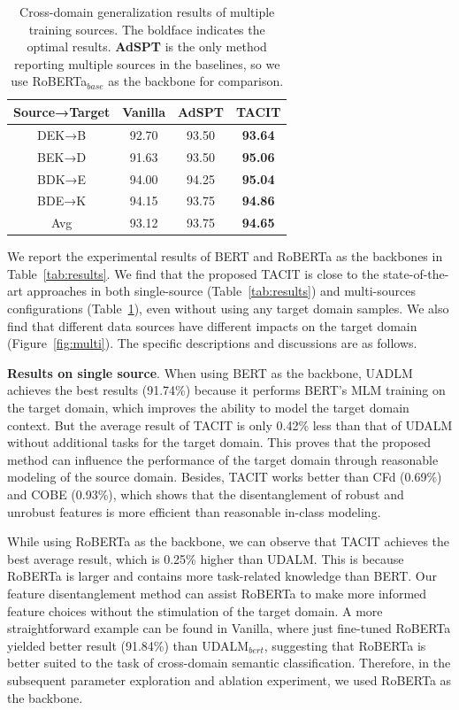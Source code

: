 \documentclass[letterpaper]{article} %
\begin{document}
\begin{table}[htbp]
	\centering
	\setlength\tabcolsep{3.3mm}
	\renewcommand{\arraystretch}{0.5}
	\begin{tabular}{cccc}
		\hline  \hline
		Source→Target & Vanilla & AdSPT & TACIT \\ \hline
		DEK→B & 92.70 & 93.50  & \textbf{93.64} \\
		BEK→D & 91.63 & 93.50  & \textbf{95.06} \\
		BDK→E & 94.00 & 94.25 & \textbf{95.04} \\
		BDE→K & 94.15 & 93.75 & \textbf{94.86} \\  \hline
		Avg   & 93.12 & 93.75 & \textbf{94.65} \\ \hline \hline
	\end{tabular}%
	\caption{Cross-domain generalization results of multiple training sources. The boldface indicates the optimal results. \textbf{AdSPT} is the only method reporting multiple sources in the baselines, so we use RoBERTa$_{base}$ as the backbone for comparison.}
	\label{tab:multi-source}%
\end{table}%

We report the experimental results of BERT and RoBERTa as the backbones in Table~\ref{tab:results}. We find that the proposed TACIT is close to the state-of-the-art approaches in both single-source (Table~\ref{tab:results}) and multi-sources configurations (Table~\ref{tab:multi-source}), even without using any target domain samples. We also find that different data sources have different impacts on the target domain (Figure~\ref{fig:multi}). The specific descriptions and discussions are as follows.

\textbf{Results on single source}. When using BERT as the backbone, UADLM achieves the best results (91.74\%) because it performs BERT's MLM training on the target domain, which improves the ability to model the target domain context. But the average result of TACIT is only 0.42\% less than that of UDALM without additional tasks for the target domain. This proves that the proposed method can influence the performance of the target domain through reasonable modeling of the source domain. Besides, TACIT works better than CFd (0.69\%) and COBE (0.93\%), which shows that the disentanglement of robust and unrobust features is more efficient than reasonable in-class modeling.

While using RoBERTa as the backbone, we can observe that TACIT achieves the best average result, which is 0.25\% higher than UDALM. This is because RoBERTa is larger and contains more task-related knowledge than BERT. Our feature disentanglement method can assist RoBERTa to make more informed feature choices without the stimulation of the target domain. A more straightforward example can be found in Vanilla, where just fine-tuned RoBERTa yielded better result (91.84\%) than UDALM$_{bert}$, suggesting that RoBERTa is better suited to the task of cross-domain semantic classification. Therefore, in the subsequent parameter exploration and ablation experiment, we used RoBERTa as the backbone.
\end{document}
